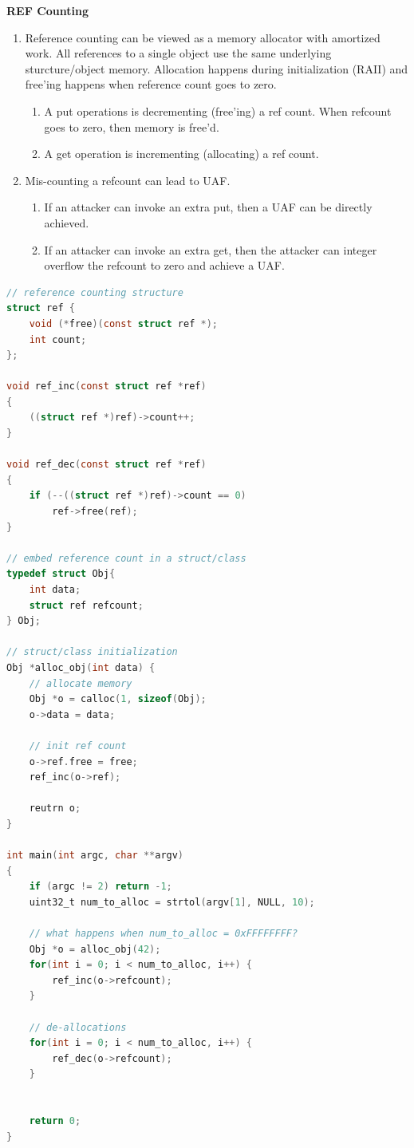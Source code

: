\documentclass[12pt]{Training}
\begin{document}
\textbf{REF Counting}
\begin{enumerate}
    \item Reference counting can be viewed as a memory allocator with amortized work. All references to a single object use the same underlying sturcture/object memory. Allocation happens during initialization (RAII) and free'ing happens when reference count goes to zero.
    \begin{enumerate}
        \item A put operations is decrementing (free'ing) a ref count. When refcount goes to zero, then memory is free'd.
        \item A get operation is incrementing (allocating) a ref count.
    \end{enumerate}
    \item Mis-counting a refcount can lead to UAF.
    \begin{enumerate}
        \item If an attacker can invoke an extra put, then a UAF can be directly achieved.
        \item If an attacker can invoke an extra get, then the attacker can integer overflow the refcount to zero and achieve a UAF.
    \end{enumerate}
\end{enumerate}
\begin{sectionbox}
\begin{lstlisting}[language=C, caption={Incorrect Reference Counting}]
// reference counting structure
struct ref {
    void (*free)(const struct ref *);
    int count;
};

void ref_inc(const struct ref *ref)
{
    ((struct ref *)ref)->count++;
}

void ref_dec(const struct ref *ref)
{
    if (--((struct ref *)ref)->count == 0)
        ref->free(ref);
}

// embed reference count in a struct/class
typedef struct Obj{
    int data;
    struct ref refcount;
} Obj;

// struct/class initialization
Obj *alloc_obj(int data) {
    // allocate memory
    Obj *o = calloc(1, sizeof(Obj);
    o->data = data;

    // init ref count
    o->ref.free = free;
    ref_inc(o->ref);

    reutrn o;
}

int main(int argc, char **argv)
{
    if (argc != 2) return -1;
    uint32_t num_to_alloc = strtol(argv[1], NULL, 10);

    // what happens when num_to_alloc = 0xFFFFFFFF?
    Obj *o = alloc_obj(42);
    for(int i = 0; i < num_to_alloc, i++) {
        ref_inc(o->refcount);
    }

    // de-allocations
    for(int i = 0; i < num_to_alloc, i++) {
        ref_dec(o->refcount);
    }
    

    return 0;
}
\end{lstlisting}
\end{sectionbox}
\end{document}
